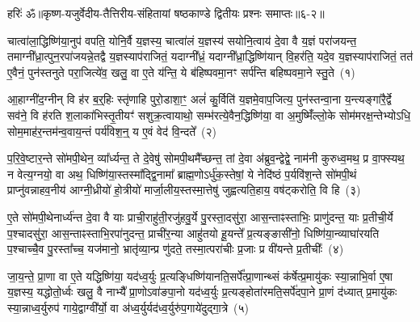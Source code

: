 {}%

{हरिः॑ ॐ}{॥कृष्ण-यजुर्वेदीय-तैत्तिरीय-संहितायां षष्ठकाण्डे द्वितीयः प्रश्नः समाप्तः॥६-२॥}

\setcounter{anuvakam}{0}
चात्वा॑ला॒द्धिष्णि॑या॒नुप॑ वपति॒ योनि॒र्वै य॒ज्ञस्य॒ चात्वा॑लं य॒ज्ञस्य॑ सयोनि॒त्वाय॑ दे॒वा वै य॒ज्ञं परा॑जयन्त॒ तमाग्नी᳚ध्रा॒त्पुन॒रपा॑जयन्ने॒तद्वै य॒ज्ञस्याप॑राजितं॒ यदाग्नी᳚ध्रं॒ यदाग्नी᳚ध्रा॒द्धिष्णि॑यान् वि॒हर॑ति॒ यदे॒व य॒ज्ञस्याप॑राजितं॒ तत॑ ए॒वैनं॒ पुन॑स्तनुते परा॒जित्ये॑व॒ खलु॒ वा ए॒ते य॑न्ति॒ ये ब॑हिष्पवमा॒नꣳ सर्प॑न्ति बहिष्पवमा॒ने स्तु॒ते~(१)

आ॒हाग्नी॑द॒ग्नीन् वि ह॑र ब॒र्॒\mbox{}हिः स्तृ॑णाहि पुरो॒डाशा॒ꣳ॒ अलं॑ कु॒र्विति॑ य॒ज्ञमे॒वाप॒जित्य॒ पुन॑स्तन्वा॒ना य॒न्त्यङ्गा॑रै॒र्द्वे सव॑ने॒ वि ह॑रति श॒लाका॑भिस्तृ॒तीयꣳ॑ सशुक्र॒त्वायाथो॒ सम्भ॑रत्ये॒वैन॒द्धिष्णि॑या॒ वा अ॒मुष्मिँ॑ल्लो॒के सोम॑मरक्ष॒न्तेभ्यो\-ऽधि॒ सोम॒माह॑र॒न्तम॑न्व॒वाय॒न्तं पर्य॑विश॒न्॒ य ए॒वं वेद॑ वि॒न्दते᳚~(२)

प॒रि॒वे॒ष्टार॒न्ते सो॑मपी॒थेन॒ व्या᳚र्ध्यन्त॒ ते दे॒वेषु॑ सोमपी॒थमै᳚च्छन्त॒ तां दे॒वा अ॑ब्रुव॒न्द्वेद्वे॒ नाम॑नी कुरुध्व॒मथ॒ प्र वा॒फ्स्यथ॒ न वेत्य॒ग्नयो॒ वा अथ॒ धिष्णि॑या॒स्तस्मा᳚द्द्वि॒नामा᳚ ब्राह्म॒णो\-ऽर्धु॑क॒स्तेषां॒ ये नेदि॑ष्ठं प॒र्यवि॑श॒न्ते सो॑मपी॒थं प्राप्नु॑वन्नाहव॒नीय॑ आग्नी॒ध्रीयो॑ हो॒त्रीयो॑ मार्जा॒लीय॒स्तस्मा॒त्तेषु॑ जुह्वत्यति॒हाय॒ वष॑ट्करोति॒ वि हि~(३)

ए॒ते सो॑मपी॒थेनार्ध्य॑न्त दे॒वा वै याः प्राची॒राहु॑ती॒रजु॑हवु॒र्ये पु॒रस्ता॒दसु॑रा॒ आस॒न्ताꣴस्ताभिः॒ प्राणु॑दन्त॒ याः प्र॒तीची॒र्ये प॒श्चादसु॑रा॒ आस॒न्ताꣴस्ताभि॒रपा॑नुदन्त॒ प्राची॑र॒न्या आहु॑तयो हू॒यन्ते᳚ प्र॒त्यङ्ङासी॑नो॒ धिष्णि॑या॒न्व्याघा॑रयति प॒श्चाच्चै॒व पु॒रस्ता᳚च्च॒ यज॑मानो॒ भ्रातृ॑व्या॒न्प्र णु॑दते॒ तस्मा॒त्परा॑चीः प्र॒जाः प्र वी॑यन्ते प्र॒तीचीः᳚~(४)

जा॒य॒न्ते॒ प्रा॒णा वा ए॒ते यद्धिष्णि॑या॒ यद॑ध्व॒र्युः प्र॒त्यङ्धिष्णि॑यानति॒सर्पे᳚त्प्रा॒णान्थ्सं क॑र्\mbox{}षेत्प्र॒मायु॑कः स्या॒न्नाभि॒र्वा ए॒षा य॒ज्ञस्य॒ यद्धोतो॒र्ध्वः खलु॒ वै नाभ्यै᳚ प्रा॒णो\-ऽवा॑ङपा॒नो यद॑ध्व॒र्युः प्र॒त्यङ्होता॑रमति॒सर्पे॑दपा॒ने प्रा॒णं द॑ध्यात् प्र॒मायु॑कः स्या॒न्नाध्व॒र्युरुप॑ गाये॒द्वाग्वी᳚र्यो॒ वा अ॑ध्व॒र्युर्यद॑ध्व॒र्युरु॑प॒गाये॑दुद्गा॒त्रे~(५)

